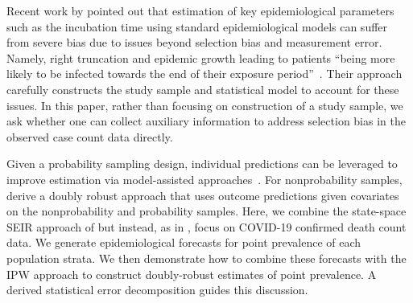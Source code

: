 \documentclass[11pt]{amsart}
\numberwithin{equation}{section}
\theoremstyle{plain}
\begin{document}
Recent work by \cite{Zhao2021} pointed out that estimation of key epidemiological parameters such as the incubation time using standard epidemiological models can suffer from severe bias due to issues beyond selection bias and measurement error.  Namely, right truncation and epidemic growth leading to patients ``being more likely to be infected towards the end of their exposure period''~\cite[pp. 3]{Zhao2021}.  Their approach carefully constructs the study sample and statistical model to account for these issues.  In this paper, rather than focusing on construction of a study sample, we ask whether one can collect auxiliary information to address selection bias in the observed case count data directly.

Given a probability sampling design, individual predictions can be leveraged to improve estimation via model-assisted approaches~\citep{Breidt2017}.  For nonprobability samples, \cite{Chen2019} derive a doubly robust approach that uses outcome predictions given covariates on the nonprobability and probability samples.  Here, we combine the state-space SEIR approach of \cite{Song2020} but instead, as in \cite{Johndrow2020}, focus on COVID-19 confirmed death count data.  We generate epidemiological forecasts for point prevalence of each population strata.  We then demonstrate how to combine these forecasts with the IPW approach to construct doubly-robust estimates of point prevalence.  A derived statistical error decomposition guides this discussion.





\end{document}
